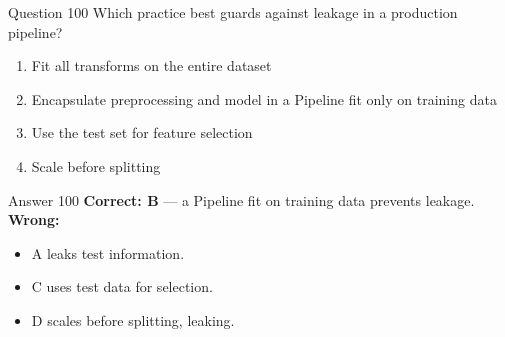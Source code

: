 \documentclass[aspectratio=169,11pt]{beamer}
\begin{document}
	\begin{frame}{Question 100}
		Which practice best guards against leakage in a production pipeline?
		\begin{enumerate}[label=\Alph*.]
			\item Fit all transforms on the entire dataset
			\item Encapsulate preprocessing and model in a Pipeline fit only on training data
			\item Use the test set for feature selection
			\item Scale before splitting
		\end{enumerate}
	\end{frame}
	\begin{frame}{Answer 100}
		\textbf{Correct: B} --- a Pipeline fit on training data prevents leakage.\\
		\vspace{0.5em}
		\textbf{Wrong:}
		\begin{itemize}
			\item A leaks test information.
			\item C uses test data for selection.
			\item D scales before splitting, leaking.
		\end{itemize}
	\end{frame}
	
\end{document}
